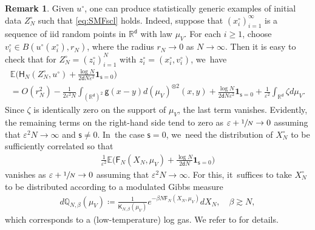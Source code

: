 \documentclass[JEP,XML,SOM,Unicode,published]{cedram}
\theoremstyle{plain}
\theoremstyle{definition}
\newtheorem{remark}[thm]{Remark}
\newcommand{\R}{{\mathbb{R}}}
\newcommand{\E}{{\mathbb{E}}}
\let\be\beta
\let\vep\varepsilon
\let\uz Z
\newcommand{\XN}{X_N}
\newcommand{\indic}{\mathbf{1}}
\newcommand{\Fr}{\mathsf{F}}
\newcommand{\Hr}{\mathsf{H}}
\renewcommand{\d}{\mathsf{d}}
\newcommand{\g}{{\mathsf{g}}}
\newcommand{\s}{\mathsf{s}}
\begin{document}
\begin{remark}\label{rem:initMEvan}
Given $u^\circ$, one can produce statistically generic examples of initial data $\uz_N^\circ$ such that \eqref{eq:SMFscl} holds. Indeed, suppose that $(x_i^\circ)_{i=1}^\infty$ is a sequence of iid random points in $\R^\d$ with law $\mu_V$. For each $i\ge 1$, choose $v_i^\circ \in B(u^\circ(x_i^\circ), r_N)$, where the radius $r_N\to 0$ as $N\to\infty$. Then it is easy to check that for $\uz_N^\circ = (z_i^\circ)_{i=1}^N$ with $z_i^\circ = (x_i^\circ,v_i^\circ)$, we~have
\begin{multline}\label{eq:initMEvan}
\E\Big(\Hr_{N}(\uz_N^\circ, u^\circ) + \frac{\log N}{2\d N \vep^2}\indic_{\s=0} \Big)\\
= {O(r_N^2)} - \frac{1}{2\vep^2 N}\int_{(\R^\d)^2}\g(x-y)d(\mu_V)^{\otimes2}(x,y)
+ \frac{\log N}{2\d N \vep^2}\indic_{\s=0} + \frac{1}{\vep^2}\int_{\R^\d}\zeta d\mu_V.
\end{multline}
Since $\zeta$ is identically zero on the support of $\mu_V$, the last term vanishes. Evidently, the remaining terms on the right-hand side tend to zero as $\vep+\sfrac{1}{N}\to 0$ assuming that $\vep^2N\to\infty$ and $\s\ne 0$. In~the case $\s=0$, we~need the distribution of $\XN^\circ$ to be sufficiently correlated so that
\begin{align*}
\frac{1}{\vep^2}\E\Big(\Fr_{N}(\XN,\mu_V) + \frac{\log N}{2\d N}\indic_{\s=0}\Big)
\end{align*}
vanishes as $\vep+\sfrac1N\to 0$ assuming that $\vep^2N \to\infty$. For this, it~suffices to take $\XN^\circ$ to be distributed according to a modulated Gibbs measure
\begin{align*}
d\mathbb{Q}_{N,\be}(\mu_V) \coloneqq \frac{1}{\mathsf{K}_{N,\be}(\mu_V)}e^{-\be N\Fr_N(\XN,\mu_V)}d\XN, \quad \be \gtrsim N,
\end{align*}
which corresponds to a (low-temperature) log gas. We refer to \cite[Chap.\,5 \& 6]{SerfatyLN} for details.
\end{remark}
\end{document}
